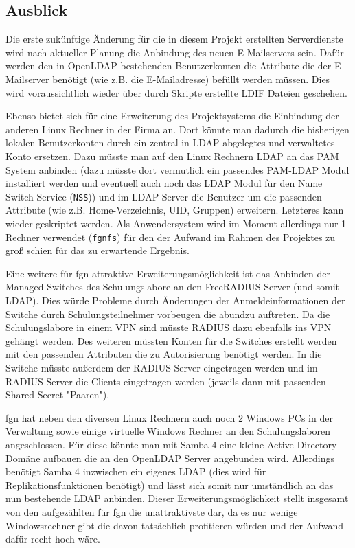 \documentclass[11pt,a4paper,titlepage=firstiscover,headsepline]{scrartcl} %
\begin{document}
\subsection{Ausblick}
Die erste zukünftige Änderung für die in diesem Projekt erstellten Serverdienste wird nach aktueller Planung die Anbindung des neuen E-Mailservers sein. Dafür werden den in OpenLDAP bestehenden Benutzerkonten die Attribute die der E-Mailserver benötigt (wie z.B. die E-Mailadresse) befüllt werden müssen. Dies wird voraussichtlich wieder über durch Skripte erstellte LDIF Dateien geschehen.

Ebenso bietet sich für eine Erweiterung des Projektsystems die Einbindung der anderen Linux Rechner in der Firma an. Dort könnte man dadurch die bisherigen lokalen Benutzerkonten durch ein zentral in LDAP abgelegtes und verwaltetes Konto ersetzen. Dazu müsste man auf den Linux Rechnern LDAP an das PAM System anbinden (dazu müsste dort vermutlich ein passendes PAM-LDAP Modul installiert werden und eventuell auch noch das LDAP Modul für den Name Switch Service (\texttt{NSS})) und im LDAP Server die Benutzer um die passenden Attribute (wie z.B. Home-Verzeichnis, UID, Gruppen) erweitern. Letzteres kann wieder geskriptet werden. Als Anwendersystem wird im Moment allerdings nur 1 Rechner verwendet (\texttt{fgnfs}) für den der Aufwand im Rahmen des Projektes zu groß schien für das zu erwartende Ergebnis.

Eine weitere für fgn attraktive Erweiterungsmöglichkeit ist das Anbinden der Managed Switches des Schulungslabore an den FreeRADIUS Server (und somit LDAP). Dies würde Probleme durch Änderungen der Anmeldeinformationen der Switche durch Schulungsteilnehmer vorbeugen die abundzu auftreten. Da die Schulungslabore in einem VPN sind müsste RADIUS dazu ebenfalls ins VPN gehängt werden. Des weiteren müssten Konten für die Switches erstellt werden mit den passenden Attributen die zu Autorisierung benötigt werden. In die Switche müsste außerdem der RADIUS Server eingetragen werden und im RADIUS Server die Clients eingetragen werden (jeweils dann mit passenden Shared Secret "Paaren").

fgn hat neben den diversen Linux Rechnern auch noch 2 Windows PCs in der Verwaltung sowie einige virtuelle Windows Rechner an den Schulungslaboren angeschlossen. Für diese könnte man mit Samba 4 eine kleine Active Directory Domäne aufbauen die an den OpenLDAP Server angebunden wird. Allerdings benötigt Samba 4 inzwischen ein eigenes LDAP (dies wird für Replikationsfunktionen benötigt) und lässt sich somit nur umständlich an das nun bestehende LDAP anbinden. Dieser Erweiterungsmöglichkeit stellt insgesamt von den aufgezählten für fgn die unattraktivste dar, da es nur wenige Windowsrechner gibt die davon tatsächlich profitieren würden und der Aufwand dafür recht hoch wäre.
\end{document}
